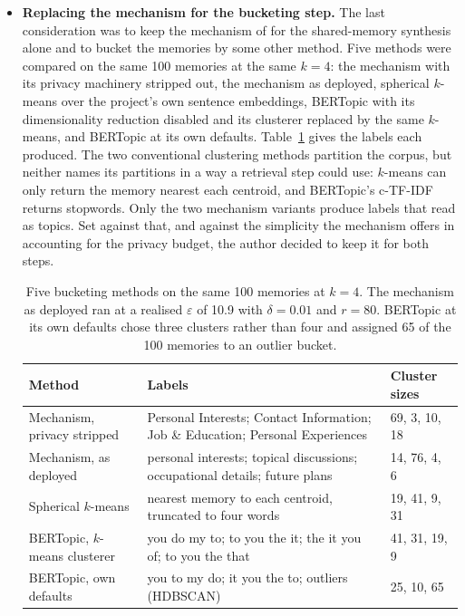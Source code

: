 \begin{itemize}
\item \textbf{Replacing the mechanism for the bucketing step.} The last consideration was to keep the mechanism of \citet{amin2024private} for the shared-memory synthesis alone and to bucket the memories by some other method. Five methods were compared on the same 100 memories at the same $k = 4$: the mechanism with its privacy machinery stripped out, the mechanism as deployed, spherical $k$-means over the project's own sentence embeddings, BERTopic with its dimensionality reduction disabled and its clusterer replaced by the same $k$-means, and BERTopic at its own defaults. Table~\ref{tab:clustering-comparison} gives the labels each produced. The two conventional clustering methods partition the corpus, but neither names its partitions in a way a retrieval step could use: $k$-means can only return the memory nearest each centroid, and BERTopic's c-TF-IDF returns stopwords. Only the two mechanism variants produce labels that read as topics. Set against that, and against the simplicity the mechanism offers in accounting for the privacy budget, the author decided to keep it for both steps.

\begin{table}[t]
\centering
\small
\begin{tabularx}{\textwidth}{@{}lXl@{}}
\toprule
\textbf{Method} & \textbf{Labels} & \textbf{Cluster sizes} \\
\midrule
Mechanism, privacy stripped & Personal Interests; Contact Information; Job \& Education; Personal Experiences & 69, 3, 10, 18 \\
\addlinespace
Mechanism, as deployed & personal interests; topical discussions; occupational details; future plans & 14, 76, 4, 6 \\
\addlinespace
Spherical $k$-means & nearest memory to each centroid, truncated to four words & 19, 41, 9, 31 \\
\addlinespace
BERTopic, $k$-means clusterer & you do my to; to you the it; the it you of; to you the that & 41, 31, 19, 9 \\
\addlinespace
BERTopic, own defaults & you to my do; it you the to; outliers (HDBSCAN) & 25, 10, 65 \\
\bottomrule
\end{tabularx}
\caption{Five bucketing methods on the same 100 memories at $k = 4$. The mechanism as deployed ran at a realised $\varepsilon$ of 10.9 with $\delta = 0.01$ and $r = 80$. BERTopic at its own defaults chose three clusters rather than four and assigned 65 of the 100 memories to an outlier bucket.}
\label{tab:clustering-comparison}
\end{table}

\end{itemize}

